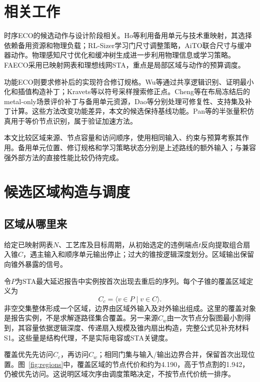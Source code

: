 \documentclass[twocolumn,10pt,fontset=windows]{ctexart}
\begin{document}
\section{相关工作}

时序ECO的候选动作与设计阶段相关。Ho等\cite{ho2010eco}利用备用单元与技术重映射，其选择依赖备用资源和物理负载；RL-Sizer\cite{liu2021rlsizer}学习门尺寸调整策略，AiTO\cite{chen2024aito}联合尺寸与缓冲器动作。物理感知尺寸优化\cite{huang2025phys}和缓冲树生成\cite{zhang2025buffalo}进一步利用物理信息或学习策略。FAECO采用已映射网表和理想线网STA，重点是局部区域与动作的预算调度。

功能ECO则要求修补后的实现符合修订规格。Wu等\cite{jiang2010fraig}通过共享逻辑识别、证明最小化和插值构造补丁；Kravets等\cite{kravets2019symbolic}以符号采样搜索修正点。Cheng等\cite{jiang2016resource}在布局冻结后的metal-only场景评价补丁与备用单元资源，Dao等\cite{zhuo2018patch}分别处理可修复性、支持集及补丁计算。这些方法改变功能差异，本文的候选保持基线功能。Pan等\cite{zhong2024stp}的半张量积仿真用于等价节点识别，属于验证加速方法。

本文比较区域来源、节点容量和访问顺序，使用相同输入、约束与预算考察其作用。备用单元位置、修订规格和学习策略状态分别是上述路线的额外输入；与兼容强外部方法的直接性能比较仍待完成。

\section{候选区域构造与调度}

\subsection{区域从哪里来}\label{sec:regions}

给定已映射网表$N$、工艺库及目标周期，从初始选定的违例端点$t$反向提取组合扇入锥$C$，遇主输入和顺序单元输出停止；过大的锥按逻辑深度划分。区域输出保留向锥外暴露的信号。

令$P$为STA最大延迟报告中实例按首次出现去重后的序列。每个子锥的覆盖区域定义为
\begin{equation}\label{eq:cover_region}
C_c=\langle v\in P\mid v\in C\rangle.
\end{equation}
非空交集整体形成一个区域，边界由区域外输入及对外输出组成。这里的覆盖对象是报告实例，不是求解逐路径集合覆盖。另一来源$C_w$由一次节点分裂图最小割得到，其容量依据逻辑深度、传递扇入规模及锥内扇出构造，完整公式见补充材料S1。这些量是结构代理，不是实际电容或STA关键度。

覆盖优先先访问$C_c$，再访问$C_w$；相同门集与输入/输出边界合并，保留首次出现位置。图~\ref{fig:regions}中，覆盖区域的节点代价和约为4.190，高于节点割的1.942，仍被优先访问。这说明区域次序由调度策略决定，不按节点代价统一排序。
\end{document}
